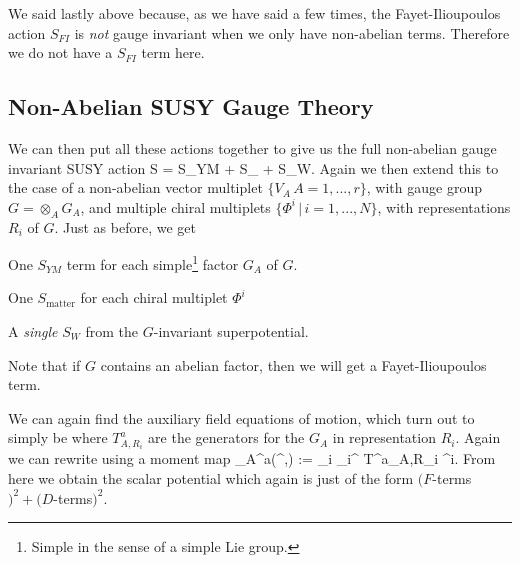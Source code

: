 We said lastly above because, as we have said a few times, the Fayet-Ilioupoulos action $S_{FI}$ is \textit{not} gauge invariant when we only have non-abelian terms. Therefore we do not have a $S_{FI}$ term here.

\subsection{Non-Abelian SUSY Gauge Theory}

We can then put all these actions together to give us the full non-abelian gauge invariant SUSY action 
\bse 
    S = S_{YM} + S_{} + S_W. 
\ese
Again we then extend this to the case of a non-abelian vector multiplet $\{V_A \, A = 1,...,r\}$, with gauge group $G = \otimes_A G_A$, and multiple chiral multiplets $\{\Phi^i\, | \, i=1,..., N\}$, with representations $R_i$ of $G$. Just as before, we get
\ben[label=(\roman*)]
    \item One $S_{YM}$ term for each simple\footnote{Simple in the sense of a simple Lie group.} factor $G_A$ of $G$. 
    \item One $S_{\text{matter}}$ for each chiral multiplet $\Phi^i$
    \item A \textit{single} $S_W$ from the $G$-invariant superpotential. 
\een 

\br 
    Note that if $G$ contains an abelian factor, then we will get a Fayet-Ilioupoulos term. 
\er 

We can again find the auxiliary field equations of motion, which turn out to simply be 
\noindent where $T^a_{A,R_i}$ are the generators for the $G_A$ in representation $R_i$. Again we can rewrite using a moment map
\bse 
    \mu_A^a(\phi^{\dagger},\phi) := \sum_i \phi_i^{\dagger} T^a_{A,R_i} \phi^i. 
\ese 
From here we obtain the scalar potential 
\noindent which again is just of the form $(F$-terms$)^2 + (D$-terms$)^2$. 

